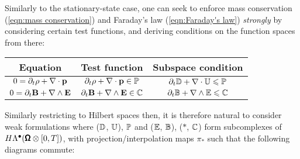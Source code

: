     Similarly to the stationary-state case, one can seek to enforce mass conservation (\ref{eqn:mass conservation}) and Faraday's law (\ref{eqn:Faraday's law}) \emph{strongly} by considering certain test functions, and deriving conditions on the function spaces from there:
    \begin{center}\begin{tabular}{ c | c | c }
        Equation  &  Test function  &  Subspace condition  \\
        \hline\hline
        $0  =  \partial_{t}\rho + \nabla\cdot\mathbf{p}$  &  $\partial_{t}\rho + \nabla\cdot\mathbf{p}  \in  \mathbb{P}$  &  $\partial_{t}\mathbb{D} + \nabla\cdot\mathbb{U}  \leqslant  \mathbb{P}$  \\
        $0  =  \partial_{t}\mathbf{B} + \nabla\wedge\mathbf{E}$  &  $\partial_{t}\mathbf{B} + \nabla\wedge\mathbf{E}  \in  \mathbb{C}$  &  $\partial_{t}\mathbb{B} + \nabla\wedge\mathbb{E}  \leqslant  \mathbb{C}$
    \end{tabular}\end{center}
    Similarly restricting to Hilbert spaces then, it is therefore natural to consider weak formulations where ($\mathbb{D}$, $\mathbb{U}$), $\mathbb{P}$ and ($\mathbb{E}$, $\mathbb{B}$), ($*$, $\mathbb{C}$) form subcomplexes of $H\Lambda^{\bullet}(\pmb{\mathsf{\Omega}}\otimes[0, T])$, with projection/interpolation maps $\pi_{*}$ such that the following diagrams commute:
    \begin{center}\end{center}

